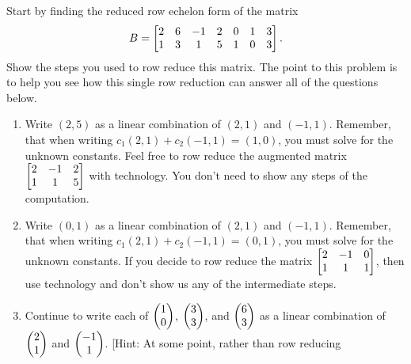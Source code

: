 



\begin{problem}
%
Start by finding the reduced row echelon form of the matrix
$$
B = 
\begin{bmatrix}
\begin{matrix} 2\\1 \end{matrix}&
\begin{matrix} 6\\3 \end{matrix}&
\begin{matrix} -1\\1 \end{matrix}&
\begin{matrix} 2\\5 \end{matrix}&
\begin{matrix} 0\\1 \end{matrix}&
\begin{matrix} 1\\0 \end{matrix}&
\begin{matrix} 3\\3 \end{matrix}
\end{bmatrix}.
$$
Show the steps you used to row reduce this matrix. 
The point to this problem is to help you see how this single row reduction can answer all of the questions below. 
\begin{enumerate}
 \item Write $(2,5)$ as a linear combination of $(2, 1)$ and $(-1,1)$. Remember, that when writing $c_1(2,1)+c_2(-1,1)=(1,0)$, you must solve for the unknown constants. Feel free to row reduce the augmented matrix  
$\begin{bmatrix}
\begin{matrix} 2\\1 \end{matrix}&
\begin{matrix} -1\\1 \end{matrix}&
\begin{matrix} 2\\5 \end{matrix}
\end{bmatrix}
$
with technology. You don't need to show any steps of the computation.
 \item Write $(0,1)$ as a linear combination of $(2, 1)$ and $(-1,1)$. Remember, that when writing $c_1(2,1)+c_2(-1,1)=(0,1)$, you must solve for the unknown constants. If you decide to row reduce the matrix
$\begin{bmatrix}
\begin{matrix} 2\\1 \end{matrix}&
\begin{matrix} -1\\1 \end{matrix}&
\begin{matrix} 0\\1 \end{matrix}
\end{bmatrix}
$, then use technology and don't show us any of the intermediate steps. 
 \item Continue to write each of $\begin{pmatrix} 1\\0 \end{pmatrix}$, $\begin{pmatrix} 3\\3 \end{pmatrix}$, and $\begin{pmatrix} 6\\3 \end{pmatrix}$ as a linear combination of $\begin{pmatrix} 2\\1 \end{pmatrix}$ and $\begin{pmatrix} -1\\1 \end{pmatrix}$. [Hint: At some point, rather than row reducing 

\end{enumerate}
\end{problem}
